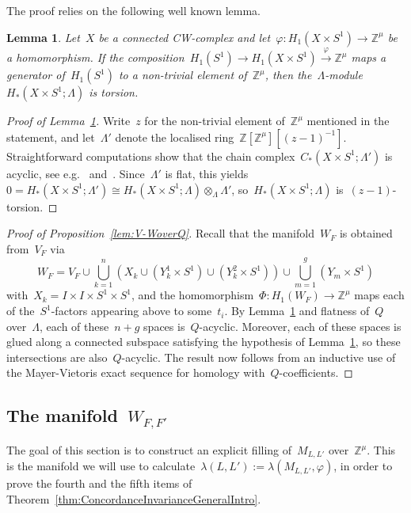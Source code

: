 \documentclass[10.9pt,a4paper]{amsart}
\newtheorem{lemma}[theorem]{Lemma}
\theoremstyle{definition}
\theoremstyle{remark}
\newcommand{\Z}{\mathbb{Z}}
\begin{document}
The proof relies on the following well known lemma.

\begin{lemma}
\label{lemma:TwistedHomologyxS1} 
Let~$X$ be a connected CW-complex and let~$\varphi \colon H_1(X\times S^1) \to \Z^\mu$ be a homomorphism.
If the composition~$H_1(S^1)\to H_1(X\times S^1)\stackrel{\varphi}{\to}\Z^\mu$ maps a generator of~$H_1(S^1)$ to a non-trivial element of~$\Z^\mu$, then the~$\Lambda$-module~$H_\ast(X\times S^1; \Lambda)$ is torsion.
\end{lemma}

\begin{proof}[Proof of Lemma~\ref{lemma:TwistedHomologyxS1}]
Write~$z$ for the non-trivial element of~$\Z^\mu$ mentioned in the statement, and let~$\Lambda'$ denote
the localised ring~$\Z[\Z^\mu][(z-1)^{-1}]$.
Straightforward computations show that the chain complex~$C_*(X\times S^1;\Lambda')$ is acyclic,
see e.g.~\cite[Example~2.7]{Nicolaescu} and~\cite[Lemma~2.2]{CFT18}.
Since~$\Lambda'$ is flat, this yields~$0=H_*(X\times S^1;\Lambda')\cong H_*(X\times S^1;\Lambda)\otimes_\Lambda\Lambda'$, so~$H_\ast(X\times S^1; \Lambda)$ is~$(z-1)$-torsion.
\end{proof}

\begin{proof}[Proof of Proposition~\ref{lem:V-WoverQ}]
Recall that the manifold~$W_F$ is obtained from~$V_F$ via
\[
W_F=V_F \cup \bigcup_{k=1}^n \left(X_k \cup (Y_k^1 \times S^1)\cup (Y_k^2\times S^1)\right)\cup \bigcup_{m=1}^{g} \left(Y_m \times S^1\right)
\]
with~$X_k=I\times I\times S^1\times S^1$, and the homomorphism~$\Phi\colon H_1(W_F)\to\Z^\mu$ maps
each of the~$S^1$-factors appearing above to some~$t_i$.
By Lemma~\ref{lemma:TwistedHomologyxS1} and flatness of~$Q$ over~$\Lambda$,
each of these~$n+g$ spaces is~$Q$-acyclic.
Moreover, each of these spaces is glued along a connected subspace satisfying the hypothesis of
Lemma~\ref{lemma:TwistedHomologyxS1}, so these intersections are also~$Q$-acyclic.
The result now follows from an inductive use of the Mayer-Vietoris exact sequence for homology with~$Q$-coefficients.
\end{proof}


\subsection{The manifold~$W_{F,F'}$}
\label{sub:WFF'}


The goal of this section is to construct an explicit filling of~$M_{L,L'}$ over~$\Z^\mu$.
This is the manifold we will use to calculate~$\lambda(L,L'):=\lambda(M_{L,L'},\varphi)$,  in order to prove the fourth and the fifth items of Theorem~\ref{thm:ConcordanceInvarianceGeneralIntro}.
\end{document}

